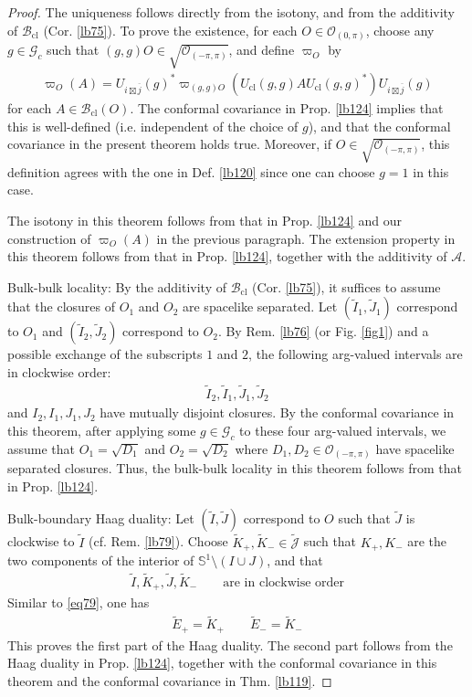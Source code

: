\documentclass[11pt,b5paper,notitlepage]{article}
\theoremstyle{definition}
\theoremstyle{plain}
\newcommand{\wtd}{\widetilde}
\newcommand{\ovl}{\overline}
\newcommand{\Jtd}{\widetilde{\mathcal J}}
\newcommand{\Sbb}{{\mathbb S}}
\newcommand{\Gc}{\mathscr G_c}
\newcommand{\MA}{\mathcal A}
\newcommand{\Bcl}{\mathcal B_{\mathrm{cl}}}
\newcommand{\Opp}{\mathcal O_{(-\pi,\pi)}}
\newcommand{\Ozp}{\mathcal O_{(0,\pi)}}
\newcommand{\ZOpp}{\sqrt{\mathcal O_{(-\pi,\pi)}}}
\newcommand{\Ucl}{U_{\mathrm{cl}}}
\numberwithin{equation}{section}
\begin{document}
\begin{proof}
The uniqueness follows directly from the isotony, and from the additivity of $\Bcl$ (Cor. \ref{lb75}). To prove the existence, for each $O\in\Ozp$, choose any $g\in\Gc$ such that $(g,g)O\in\ZOpp$, and define $\varpi_O$ by
\begin{align*}
\varpi_{O}(A)=U_{i\boxtimes\ovl j}(g)^*\varpi_{(g,g)O}(\Ucl(g,g)A\Ucl(g,g)^*)U_{i\boxtimes\ovl j}(g)
\end{align*}
for each $A\in\Bcl(O)$. The conformal covariance in Prop. \ref{lb124} implies that this is well-defined (i.e. independent of the choice of $g$), and that the conformal covariance in the present theorem holds true. Moreover, if $O\in\ZOpp$, this definition agrees with the one in Def. \ref{lb120} since one can choose $g=1$ in this case.

The isotony in this theorem follows from that in Prop. \ref{lb124} and our construction of $\varpi_O(A)$ in the previous paragraph. The extension property in this theorem follows from that in Prop. \ref{lb124}, together with the additivity of $\MA$. 

Bulk-bulk locality: By the additivity of $\Bcl$ (Cor. \ref{lb75}), it suffices to assume that the closures of $O_1$ and $O_2$ are spacelike separated. Let $(\wtd I_1,\wtd J_1)$ correspond to $O_1$ and $(\wtd I_2,\wtd J_2)$ correspond to $O_2$. By Rem. \ref{lb76} (or Fig. \ref{fig1}) and a possible exchange of the subscripts $1$ and $2$, the following arg-valued intervals are in clockwise order:
\begin{align*}
\wtd I_2,\wtd I_1,\wtd J_1,\wtd J_2
\end{align*}
and $I_2,I_1,J_1,J_2$ have mutually disjoint closures. By the conformal covariance in this theorem, after applying some $g\in\Gc$ to these four arg-valued intervals, we assume that $O_1=\sqrt{D_1}$ and $O_2=\sqrt{D_2}$ where $D_1,D_2\in\Opp$ have spacelike separated closures. Thus, the bulk-bulk locality in this theorem follows from that in Prop. \ref{lb124}.


Bulk-boundary Haag duality: Let $(\wtd I,\wtd J)$ correspond to $O$ such that $\wtd J$ is clockwise to $\wtd I$ (cf. Rem. \ref{lb79}). Choose $\wtd K_+,\wtd K_-\in\Jtd$ such that $K_+,K_-$ are the two components of the interior of $\Sbb^1\setminus(I\cup J)$, and that
\begin{align*}
\wtd I,\wtd K_+, \wtd J,\wtd K_- \qquad\text{are in clockwise order}
\end{align*}
Similar to \eqref{eq79}, one has
\begin{align}
\wtd E_+=\wtd K_+\qquad \wtd E_-=\wtd K_-
\end{align}
This proves the first part of the Haag duality. The second part follows from the Haag duality in Prop. \ref{lb124}, together with the conformal covariance in this theorem and the conformal covariance in Thm. \ref{lb119}.
\end{proof}
\end{document}
